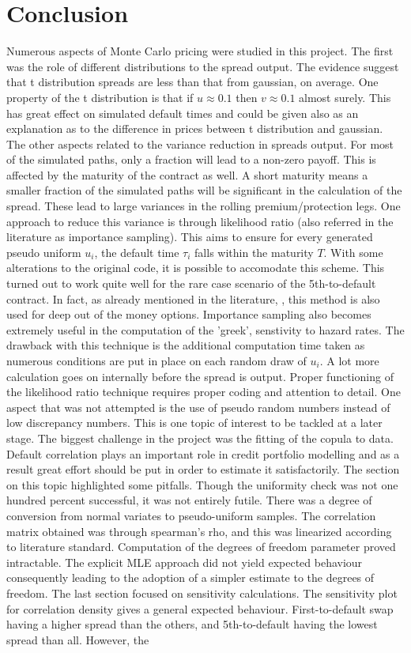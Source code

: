 \documentclass[a4paper,12pt]{article}
\begin{document}
\section{Conclusion}
Numerous aspects of Monte Carlo pricing were studied in this project. The first was the role of different distributions to the spread output. The evidence suggest that t distribution spreads are less than that from gaussian, on average. One property of the t distribution is that if $u \approx 0.1$ then $v \approx 0.1$ almost surely. This has great effect on simulated default times and could be given also as an explanation as to the difference in prices between t distribution and gaussian. The other aspects related to the variance reduction in spreads output. For most of the simulated paths, only a fraction will lead to a non-zero payoff. This is affected by the maturity of the contract as well. A short maturity means a smaller fraction of the simulated paths will be significant in the calculation of the spread. These lead to large variances in the rolling premium/protection legs. One approach to reduce this variance is through likelihood ratio (also referred in the literature as importance sampling). This aims to ensure for every generated pseudo uniform $u_i$, the default time $\tau_i$ falls within the maturity $T$. With some alterations to the original code, it is possible to accomodate this scheme. This turned out to work quite well for the rare case scenario of the 5th-to-default contract. In fact, as already mentioned in the literature, \cite{peter_jackel}, this method is also used for deep out of the money options. Importance sampling also becomes extremely useful in the computation of the 'greek', senstivity to hazard rates. The drawback with this technique is the additional computation time taken as numerous conditions are put in place on each random draw of $u_i$. A lot more calculation goes on internally before the spread is output. Proper functioning of the likelihood ratio technique requires proper coding and attention to detail. One aspect that was not attempted is the use of pseudo random numbers instead of low discrepancy numbers. This is one topic of interest to be tackled at a later stage. The biggest challenge in the project was the fitting of the copula to data. Default correlation plays an important role in credit portfolio modelling and as a result great effort should be put in order to estimate it satisfactorily. The section on this topic highlighted some pitfalls. Though the uniformity check was not one hundred percent successful, it was not entirely futile. There was a degree of conversion from normal variates to pseudo-uniform samples. The correlation matrix obtained was through spearman's rho, and this was linearized according to literature standard. Computation of the degrees of freedom parameter proved intractable. The explicit MLE approach did not yield expected behaviour consequently leading to the adoption of a simpler estimate to the degrees of freedom. The last section focused on sensitivity calculations. The sensitivity plot for correlation density gives a general expected behaviour. First-to-default swap having a higher spread than the others, and 5th-to-default having the lowest spread than all. However, the 
\end{document}
